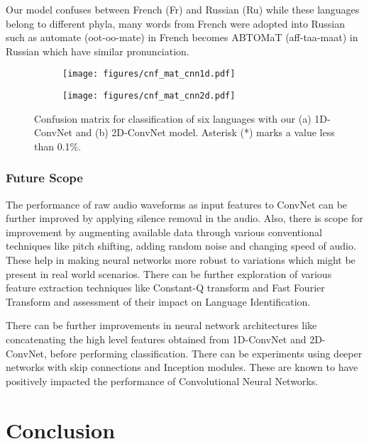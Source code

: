 \documentclass[runningheads]{llncs}
\begin{document}
Our model confuses between French (Fr) and Russian (Ru) while these languages belong to different phyla, many words from French were adopted into Russian such as automate (oot-oo-mate) in French becomes ABTOMaT (aff-taa-maat) in Russian which have similar pronunciation.

\vspace{-4mm}
\begin{figure}
 \begin{subfigure}{.5\textwidth}
 \centering\texttt{[image: figures/cnf\_mat\_cnn1d.pdf]}
 \caption{}
 \end{subfigure}
 \hspace{4pt}
 \begin{subfigure}{.5\textwidth}
 \centering\texttt{[image: figures/cnf\_mat\_cnn2d.pdf]}
 \caption{}
 \end{subfigure}
  \caption{Confusion matrix for classification of six languages with our (a) 1D-ConvNet and (b) 2D-ConvNet model. Asterisk (*) marks a value less than 0.1\%.}
 \label{fig:cnf_mat}
\vspace{-8mm}
\end{figure}


\subsubsection{Future Scope}
The performance of raw audio waveforms as input features to ConvNet can be further improved by applying silence removal in the audio. Also, there is scope for improvement by augmenting available data through various conventional techniques like pitch shifting, adding random noise and changing speed of audio. These help in making neural networks more robust to variations which might be present in real world scenarios. There can be further exploration of various feature extraction techniques like Constant-Q transform and Fast Fourier Transform and assessment of their impact on Language Identification.

There can be further improvements in neural network architectures like concatenating the high level features obtained from 1D-ConvNet and 2D-ConvNet, before performing classification. There can be experiments using deeper networks with skip connections and Inception modules. These are known to have positively impacted the performance of Convolutional Neural Networks.

\section{Conclusion}
\end{document}
